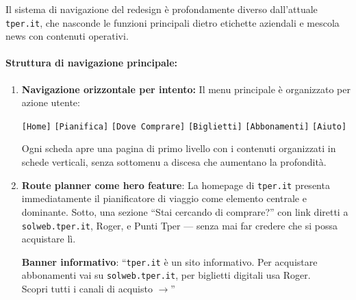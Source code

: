 \begin{tcolorbox}[colback=backgroundColor,colframe=borderColor,arc=2mm]
{\small

Il sistema di navigazione del redesign è profondamente diverso dall'attuale \texttt{tper.it}, che nasconde le funzioni principali dietro etichette aziendali e mescola news con contenuti operativi.

\paragraph{Struttura di navigazione principale:}

\begin{enumerate}[leftmargin=*]

 \item \textbf{Navigazione orizzontale per intento:} Il menu principale è organizzato per azione utente:
 \begin{center}
 \begin{tcolorbox}[colback=primaryColor!5,colframe=primaryColor,arc=2mm,width=0.95\textwidth]
 \small
 \texttt{[Home]} \quad \texttt{[Pianifica]} \quad \texttt{[Dove Comprare]} \quad \texttt{[Biglietti]} \quad \texttt{[Abbonamenti]} \quad \texttt{[Aiuto]}
 \end{tcolorbox}
 \end{center}
 Ogni scheda apre una pagina di primo livello con i contenuti organizzati in schede verticali, senza sottomenu a discesa che aumentano la profondità.

 \item \textbf{Route planner come hero feature}: La homepage di \texttt{tper.it} presenta immediatamente il pianificatore di viaggio come elemento centrale e dominante. Sotto, una sezione ``Stai cercando di comprare?'' con link diretti a \texttt{solweb.tper.it}, Roger, e Punti Tper --- senza mai far credere che si possa acquistare lì.

 \begin{center}
 \begin{tcolorbox}[colback=accentOrange!10,colframe=accentOrange,arc=2mm,width=0.85\textwidth]
 \small \textbf{Banner informativo}: ``\texttt{tper.it} è un sito informativo. Per acquistare abbonamenti vai su \texttt{solweb.tper.it}, per biglietti digitali usa Roger. \\
 Scopri tutti i canali di acquisto $\rightarrow$''
 \end{tcolorbox}
 \end{center}


\end{enumerate}}
\end{tcolorbox}
